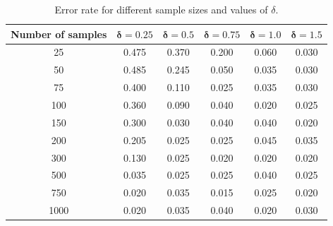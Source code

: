 \documentclass[12pt,a4paper]{report}
\begin{document}
\begin{table}[ht]
    \centering
    \caption{Error rate for different sample sizes and values of $\delta$.}
    \label{tab:error_delta}

    \begin{tabular}{c|ccccc}
        \hline
        \textbf{Number of samples}
        & $\boldsymbol{\delta=0.25}$
        & $\boldsymbol{\delta=0.5}$
        & $\boldsymbol{\delta=0.75}$
        & $\boldsymbol{\delta=1.0}$
        & $\boldsymbol{\delta=1.5}$ \\
        \hline

        25   & 0.475 & 0.370 & 0.200 & 0.060 & 0.030 \\
        50   & 0.485 & 0.245 & 0.050 & 0.035 & 0.030 \\
        75   & 0.400 & 0.110 & 0.025 & 0.035 & 0.030 \\
        100  & 0.360 & 0.090 & 0.040 & 0.020 & 0.025 \\
        150  & 0.300 & 0.030 & 0.040 & 0.040 & 0.020 \\
        200  & 0.205 & 0.025 & 0.025 & 0.045 & 0.035 \\
        300  & 0.130 & 0.025 & 0.020 & 0.020 & 0.020 \\
        500  & 0.035 & 0.025 & 0.025 & 0.040 & 0.025 \\
        750  & 0.020 & 0.035 & 0.015 & 0.025 & 0.020 \\
        1000 & 0.020 & 0.035 & 0.040 & 0.020 & 0.030 \\

        \hline
    \end{tabular}
\end{table}
\end{document}
